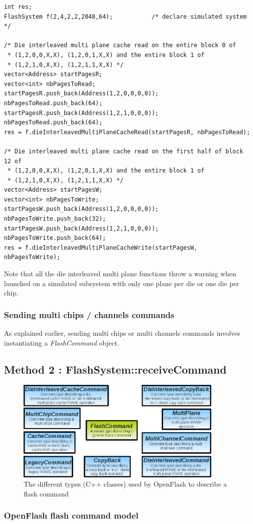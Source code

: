 \begin{lstlisting}
int res;
FlashSystem f(2,4,2,2,2048,64);           /* declare simulated system */

/* Die interleaved multi plane cache read on the entire block 0 of 
 * (1,2,0,0,X,X), (1,2,0,1,X,X) and the entire block 1 of 
 * (1,2,1,0,X,X), (1,2,1,1,X,X) */
vector<Address> startPagesR;
vector<int> nbPagesToRead;
startPagesR.push_back(Address(1,2,0,0,0,0));
nbPagesToRead.push_back(64);
startPagesR.push_back(Address(1,2,1,0,0,0));
nbPagesToRead.push_back(64);
res = f.dieInterleavedMultiPlaneCacheRead(startPagesR, nbPagesToRead);

/* Die interleaved multi plane cache read on the first half of block 12 of 
 * (1,2,0,0,X,X), (1,2,0,1,X,X) and the entire block 1 of 
 * (1,2,1,0,X,X), (1,2,1,1,X,X) */
vector<Address> startPagesW;
vector<int> nbPagesToWrite;
startPagesW.push_back(Address(1,2,0,0,0,0));
nbPagesToWrite.push_back(32);
startPagesW.push_back(Address(1,2,1,0,0,0));
nbPagesToWrite.push_back(64);
res = f.dieInterleavedMultiPlaneCacheWrite(startPagesW, nbPagesToWrite);
\end{lstlisting}

Note that all the die interleaved multi plane functions throw a warning when launched on a simulated subsystem with only one plane per die or one die per chip.

\subsubsection{Sending multi chips / channels commands}

As explained earlier, sending multi chips or multi channels commands involves instantiating a \emph{FlashCommand} object.

\subsection{Method 2 : FlashSystem::receiveCommand}

\begin{figure}
  \center
  \includegraphics[width=0.9\textwidth]{Includes/FlashCommandModel.png}
  \caption{The different types (C++ classes) used by OpenFlash to describe a flash command}
  \label{fig:flashcommandmodel}
\end{figure}

\subsubsection{OpenFlash flash command model}




